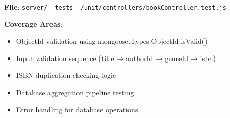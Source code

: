 \textbf{File}: \texttt{server/\_\_tests\_\_/unit/controllers/bookController.test.js}

\textbf{Coverage Areas}:
\begin{itemize}
    \item ObjectId validation using mongoose.Types.ObjectId.isValid()
    \item Input validation sequence (title → authorId → genreId → isbn)
    \item ISBN duplication checking logic
    \item Database aggregation pipeline testing
    \item Error handling for database operations
\end{itemize}

